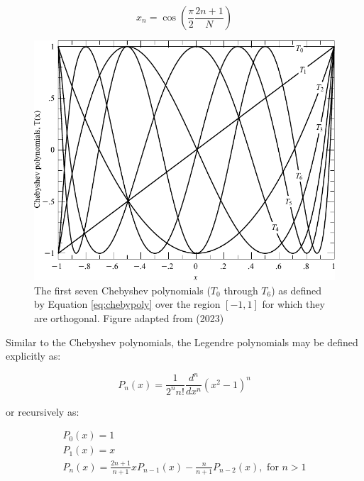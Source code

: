 \begin{equation}
    x_{n} = \cos{\left(  \frac{\pi}{2} \frac{2 n + 1}{N} \right)}
\end{equation}


\begin{figure}[t]
    \centering
    \includegraphics[width = 12cm]{figures/2_chebyshev.pdf}
    \caption{The first seven Chebyshev polynomials ($T_0$ through $T_{6}$) as defined by Equation \ref{eq:chebypoly} over the region $[-1, 1]$ for which they are orthogonal. Figure adapted from \citep{numerical_recipes} (2023)\protect\footnotemark}
    \label{fig:chebyshev}
\end{figure}

Similar to the Chebyshev polynomials, the Legendre polynomials may be defined explicitly as:

\begin{equation}
    P_{n}(x) = \frac{1}{2^{n} n!} \frac{d^{n}}{d x^{n}} (x^{2} - 1)^{n}
    \label{eq:legpolyexplicit}
\end{equation}

\noindent or recursively as:

\begin{equation}
    \begin{gathered}
        P_{0}(x) = 1 \\
        P_{1}(x) = x \\
        P_{n}(x) = \frac{2 n + 1}{n + 1} x P_{n - 1}(x) - \frac{n}{n + 1} P_{n - 2}(x), \text{ for } n > 1
    \end{gathered}
    \label{eq:legpoly}
\end{equation}

